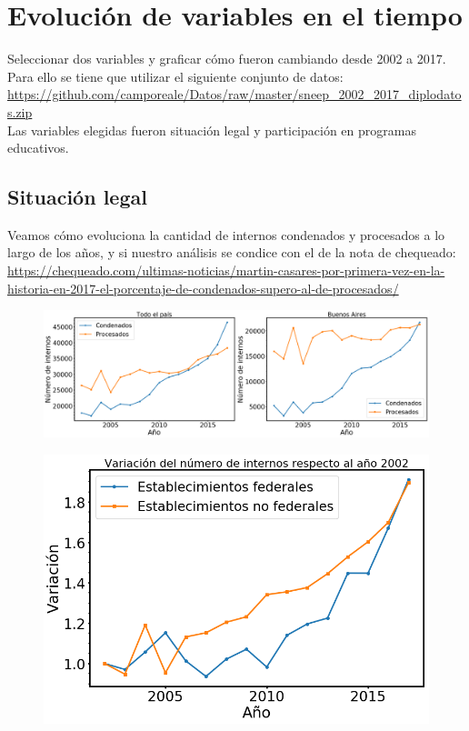 \documentclass[10pt]{article}
\begin{document}
\section{Evolución de variables en el tiempo}
Seleccionar dos variables y graficar cómo fueron cambiando desde 2002 a 2017. Para ello se tiene que utilizar el siguiente conjunto de datos: \url{https://github.com/camporeale/Datos/raw/master/sneep_2002_2017_diplodatos.zip}\\

Las variables elegidas fueron situación legal y participación en programas educativos.

\subsection{Situación legal}

Veamos cómo evoluciona la cantidad de internos condenados y procesados a lo largo de los años, y si nuestro análisis se condice con el de la nota de chequeado: \url{https://chequeado.com/ultimas-noticias/martin-casares-por-primera-vez-en-la-historia-en-2017-el-porcentaje-de-condenados-supero-al-de-procesados/}

\begin{figure}[H]
	\centering
	\includegraphics[scale=0.28]{graficos/situacion.png}
	\caption{}
\end{figure}

\begin{figure}[H]
	\centering
	\includegraphics[scale=0.3]{graficos/variacion.png}
	\caption{}
\end{figure}
\end{document}
